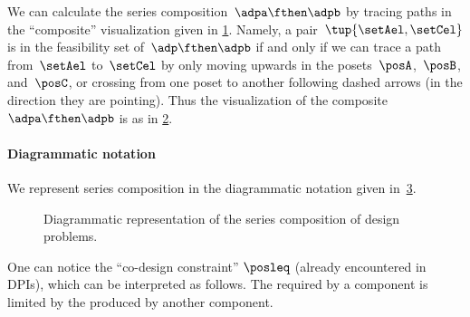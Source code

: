 We can calculate the series composition~$\adpa \fthen \adpb$ by tracing paths in the ``composite'' visualization given in \cref{fig:example_dp_graph_xyz}.
Namely, a pair~$\tup{\setAel, \setCel}$ is in the feasibility set of~$\adp \fthen \adpb$ if and only if we can trace a path from~$\setAel$ to~$\setCel$ by only moving upwards in the posets~$\posA$,~$\posB$, and~$\posC$, or crossing from one poset to another following dashed arrows (in the direction they are pointing).
Thus the visualization of the composite~$\adpa \fthen \adpb$ is as in \cref{fig:example_dp_graph_xz}.
\begin{figure}[h!]
	\centering
	\caption{}
	\label{fig:example_dp_graph_xyz}
\end{figure}
\begin{figure}[h!]
	\centering
	\caption{}
	\label{fig:example_dp_graph_xz}
\end{figure}


\paragraph{Diagrammatic notation}
We represent series composition in the diagrammatic notation given in~\cref{fig:compositiondiagram}.

\begin{figure}[h!]
	\centering
	\caption{Diagrammatic representation of the series composition of design problems. }
	\label{fig:compositiondiagram}
\end{figure}

One can notice the ``co-design constraint'' $\posleq$ (already encountered in DPIs), which can be interpreted as follows.
The  required by a component is limited by the  produced by another component.

